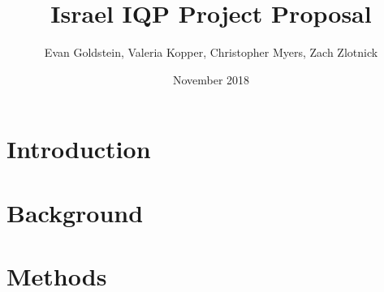 \documentclass{article}
\title{Israel IQP Project Proposal}
\author{Evan Goldstein, Valeria Kopper, Christopher Myers, Zach Zlotnick}
\date{November 2018}
\begin{document}
\maketitle
\tableofcontents
\newpage

\section{Introduction}

\section{Background}

\section{Methods}
\end{document}
